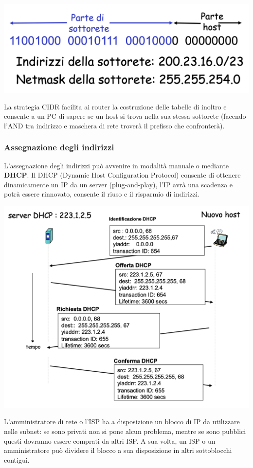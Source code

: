 \documentclass{report}
\begin{document}
\begin{center}
		\includegraphics[width=0.5\linewidth]{cidr}
	\end{center}

La strategia CIDR facilita ai router la costruzione delle tabelle di
inoltro e consente a un PC di sapere se un host si trova nella sua
stessa sottorete (facendo l'AND tra indirizzo e maschera di rete troverà
il prefisso che confronterà).

\hypertarget{header-n110}{%
\subsubsection{Assegnazione degli indirizzi}\label{header-n110}}

L'assegnazione degli indirizzi può avvenire in modalità manuale o
mediante \textbf{DHCP}. Il DHCP (Dynamic Host Configuration Protocol)
consente di ottenere dinamicamente un IP da un server (plug-and-play),
l'IP avrà una scadenza e potrà essere rinnovato, consente il riuso e il
risparmio di indirizzi.

\begin{center}
		\includegraphics[width=0.7\linewidth]{dhcp}
	\end{center}

L'amministratore di rete o l'ISP ha a disposizione un blocco di IP da
utilizzare nelle subnet: se sono privati non si pone alcun problema,
mentre se sono pubblici questi dovranno essere comprati da altri ISP. A
sua volta, un ISP o un amministratore può dividere il blocco a sua
disposizione in altri sottoblocchi contigui.
\end{document}

